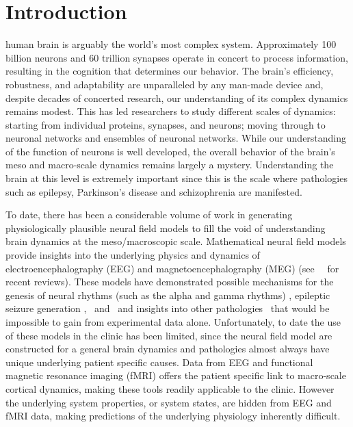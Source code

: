 \documentclass[onecolumn,draftcls]{IEEEtran}
\begin{document}
\section{Introduction}
 human brain is arguably the world's most complex system. Approximately 100 billion neurons and 60 trillion synapses operate in concert to process information, resulting in the cognition that determines our behavior. The brain's efficiency, robustness, and adaptability are unparalleled by any man-made device and, despite decades of concerted research, our understanding of its complex dynamics remains modest. This has led researchers to study different scales of dynamics: starting from individual proteins, synapses, and neurons; moving through to neuronal networks and ensembles of neuronal networks. While our understanding of the function of neurons is well developed, the overall behavior of the brain's meso and macro-scale dynamics remains largely a mystery.  Understanding the brain at this level is extremely important since this is the scale where pathologies such as epilepsy, Parkinson's disease and schizophrenia are manifested.

To date, there has been a considerable volume of work in generating physiologically plausible neural field models to fill the void of understanding brain dynamics at the meso/macroscopic scale. Mathematical neural field  models provide insights into the underlying physics and dynamics of electroencephalography (EEG) and magnetoencephalography (MEG) (see~\cite{Deco2008}~\cite{David2003} for recent reviews). These models have demonstrated possible mechanisms for the genesis of neural rhythms (such as the alpha and gamma rhythms) \cite{Liley1999} \cite{RENNIE2000}, epileptic seizure generation \cite{DaSilva2003},~\cite{Suffczynski2004} and~\cite{Wendling2005} and insights into other pathologies~\cite{Moran2008} \cite{Schiff2009} that would be impossible to gain from experimental data alone. Unfortunately, to date the use of these models in the clinic has been limited, since the neural field model are constructed for a general brain dynamics and pathologies almost always have unique underlying patient specific causes. Data from EEG and functional magnetic resonance imaging (fMRI) offers the patient specific link to macro-scale cortical dynamics, making these tools readily applicable to the clinic. However the underlying system properties, or system states, are hidden from EEG and fMRI data, making predictions of the underlying physiology inherently difficult.
\end{document}
